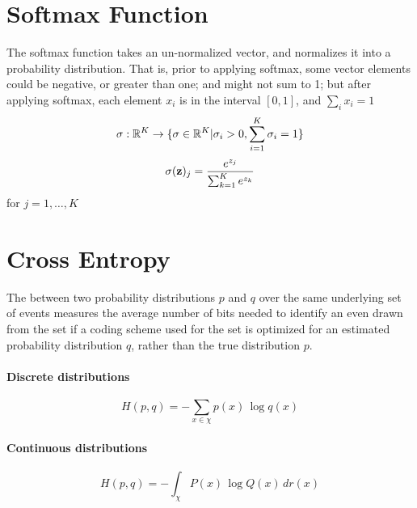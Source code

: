 \documentclass[11pt]{article}
\begin{document}
	\section{Softmax Function}
	The softmax function takes an un-normalized vector, and normalizes it into a probability distribution. That is, prior to applying softmax, some vector elements could be negative, or greater than one; and might not sum to 1; but after applying softmax, each element $x_i$ is in the interval $[0,1]$, and $\sum_i x_i = 1$ \\
	$$\sigma:\mathbb{R}^K \rightarrow \{\sigma\in \mathbb{R}^K|\sigma_i>0,\sum_{i=1}^K \sigma_i = 1\}$$
	$$\sigma(\textbf{z})_j = \frac{e^{z_j}}{\sum_{k=1}^K e^{z_k}}$$ for $j = 1,\hdots,K$
	
	\section{Cross Entropy}
	The  between two probability distributions $p$ and $q$ over the same underlying set of events measures the average number of bits needed to identify an even drawn from the set if a coding scheme used for the set is optimized for an estimated probability distribution $q$, rather than the true distribution $p$.
	\paragraph{Discrete distributions}
	$$ H(p, q) = - \sum_{x \in \chi} p(x) \, \log q(x) $$
	\paragraph{Continuous distributions}
	$$ H(p, q) = - \int_\chi P(x)\, \log Q(x) \, dr(x) $$
\end{document}
